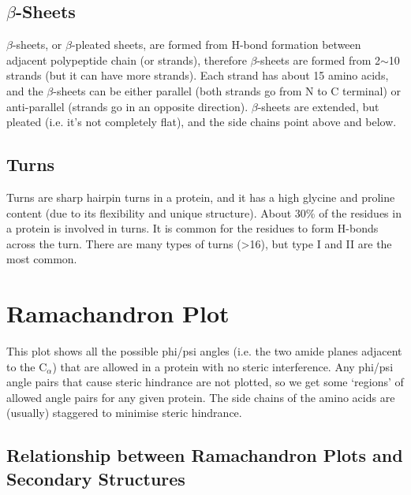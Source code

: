 \begin{center}
\end{center}

\subsection{$\beta$-Sheets}

$\beta$-sheets, or $\beta$-pleated sheets, are formed from H-bond formation between adjacent polypeptide chain (or strands), therefore $\beta$-sheets are formed from 2$\sim$10 strands (but it can have more strands).
Each strand has about 15 amino acids, and the $\beta$-sheets can be either parallel (both strands go from N to C terminal) or anti-parallel (strands go in an opposite direction).
$\beta$-sheets are extended, but pleated (i.e. it's not completely flat), and the side chains point above and below.

\begin{center}
\end{center}

\subsection{Turns}

Turns are sharp hairpin turns in a protein, and it has a high glycine and proline content (due to its flexibility and unique structure).
About 30\% of the residues in a protein is involved in turns.
It is common for the residues to form H-bonds across the turn.
There are many types of turns (\textgreater16), but type I and II are the most common.

\section{Ramachandron Plot}

This plot shows all the possible phi/psi angles (i.e. the two amide planes adjacent to the C$_{\alpha}$) that are allowed in a protein with no steric interference.
Any phi/psi angle pairs that cause steric hindrance are not plotted, so we get some `regions' of allowed angle pairs for any given protein.
The side chains of the amino acids are (usually) staggered to minimise steric hindrance.

\subsection{Relationship between Ramachandron Plots and Secondary Structures}

